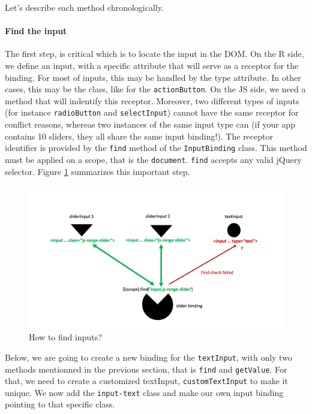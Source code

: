 \documentclass[]{book}
\let\oldparagraph\paragraph
\renewcommand{\paragraph}[1]{\oldparagraph{#1}\mbox{}}
\begin{document}
Let's describe each method chronologically.

\hypertarget{find-the-input}{%
\paragraph{Find the input}\label{find-the-input}}

The first step, is critical which is to locate the input in the DOM. On the R side, we define an input, with a specific attribute that will serve as a receptor for the binding. For most of inputs, this may be handled by the type attribute. In other cases, this may be the class, like for the \texttt{actionButton}. On the JS side, we need a method that will indentify this receptor. Moreover, two different types of inputs (for instance \texttt{radioButton} and \texttt{selectInput}) cannot have the same receptor for conflict reasons, whereas two instances of the same input type can (if your app contains 10 sliders, they all share the same input binding!). The receptor identifier is provided by the \texttt{find} method of the \texttt{InputBinding} class. This method must be applied on a scope, that is the \texttt{document}. \texttt{find} accepts any valid jQuery selector. Figure \ref{fig:shiny-find-inputs} summarizes this important step.

\begin{figure}
\includegraphics[width=20in]{images/survival-kit/shiny-find-inputs} \caption{How to find inputs?}\label{fig:shiny-find-inputs}
\end{figure}

Below, we are going to create a new binding for the \texttt{textInput}, with only two methods mentionned in the previous section, that is \texttt{find} and \texttt{getValue}. For that, we need to create a customized textInput, \texttt{customTextInput} to make it unique. We now add the \texttt{input-text} class and make our own input binding pointing to that specific class.
\end{document}
